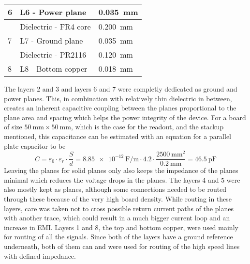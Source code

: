 \begin{table}[]
\begin{tabular}{|l|l|l|}
    6                                    & L6 - Power plane                   & \SI{0.035}{\milli\meter}                                   \\ \hline
                                         & Dielectric - FR4 core              & \SI{0.200}{\milli\meter}                                   \\ \hline
    7                                    & L7 - Ground plane                  & \SI{0.035}{\milli\meter}                                   \\ \hline
                                         & Dielectric - PR2116                & \SI{0.120}{\milli\meter}                                   \\ \hline
    8                                    & L8 - Bottom copper                 & \SI{0.018}{\milli\meter}                                   \\ \hline
    \end{tabular}
    \label{tab:stackup}
\end{table}
\FloatBarrier
The layers 2 and 3 and layers 6 and 7 were completly dedicated as ground and power planes. This, in combination with relatively thin dielectric in between, creates an inherent capacitive coupling between the planes proportional to the plane area and spacing which helps the power integrity of the device. For a board of size $\SI{50}{\milli\meter} \times \SI{50}{\milli\meter}$, which is the case for the readout, and the stackup mentioned, this capacitance can be estimated with an equation for a parallel plate capacitor to be
%
\begin{equation}
C = \varepsilon_0 \cdot \varepsilon_r \cdot \frac{S}{d} = \SI{8.85e-12}{\farad\per\meter} \cdot 4.2 \cdot \frac{\SI{2500}{\milli\meter\squared}}{\SI{0.2}{\milli\meter}} = \SI{46.5}{\pico\farad}
\end{equation}
%
Leaving the planes for solid planes only also keeps the impedance of the planes minimal which reduces the voltage drops in the planes. The layers 4 and 5 were also mostly kept as planes, although some connections needed to be routed through these because of the very high board density. While routing in these layers, care was taken not to cross possible return current paths of the planes with another trace, which could result in a much bigger current loop and an increase in EMI. Layers 1 and 8, the top and bottom copper, were used mainly for routing of all the signals. Since both of the layers have a ground reference underneath, both of them can and were used for routing of the high speed lines with defined impedance. 
%
